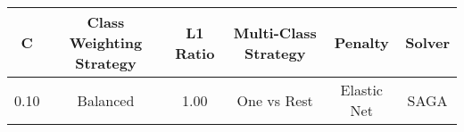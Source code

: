 \small
\begin{tabular}{cccccc}
\toprule
C & Class Weighting Strategy & L1 Ratio & Multi-Class Strategy & Penalty & Solver \\
\midrule
0.10 & Balanced & 1.00 & One vs Rest & Elastic Net & SAGA \\
\bottomrule
\end{tabular}

\normalsize